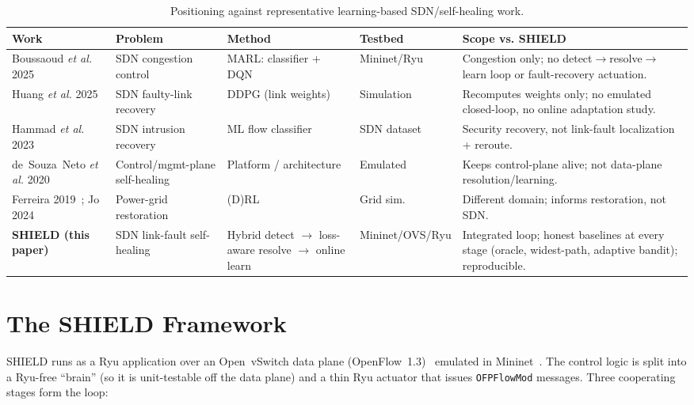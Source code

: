 \documentclass[conference]{IEEEtran}
\begin{document}
\begin{table}[t]
\centering
\footnotesize
\caption{Positioning against representative learning-based SDN/self-healing work.}
\label{tab:related}
\begin{tabular}{@{}p{2.0cm}p{2.7cm}p{2.6cm}p{2.2cm}p{4.4cm}@{}}
\toprule
\textbf{Work} & \textbf{Problem} & \textbf{Method} & \textbf{Testbed} & \textbf{Scope vs. SHIELD} \\
\midrule
Boussaoud \emph{et al.} 2025~\cite{boussaoud2025} & SDN congestion control & MARL: classifier + DQN & Mininet/Ryu & Congestion only; no detect$\rightarrow$resolve$\rightarrow$learn loop or fault-recovery actuation. \\
Huang \emph{et al.} 2025~\cite{huang2025} & SDN faulty-link recovery & DDPG (link weights) & Simulation & Recomputes weights only; no emulated closed-loop, no online adaptation study. \\
Hammad \emph{et al.} 2023~\cite{hammad2023} & SDN intrusion recovery & ML flow classifier & SDN dataset & Security recovery, not link-fault localization + reroute. \\
de~Souza~Neto \emph{et al.} 2020~\cite{neto2020} & Control/mgmt-plane self-healing & Platform / architecture & Emulated & Keeps control-plane alive; not data-plane resolution/learning. \\
Ferreira 2019~\cite{ferreira2019}; Jo 2024~\cite{jo2024} & Power-grid restoration & (D)RL & Grid sim. & Different domain; informs restoration, not SDN. \\
\textbf{SHIELD (this paper)} & SDN link-fault self-healing & Hybrid detect $\rightarrow$ loss-aware resolve $\rightarrow$ online learn & Mininet/OVS/Ryu & Integrated loop; honest baselines at every stage (oracle, widest-path, adaptive bandit); reproducible. \\
\bottomrule
\end{tabular}
\end{table}

\section{The SHIELD Framework}
\label{sec:arch}
SHIELD runs as a Ryu application over an Open~vSwitch data plane
(OpenFlow~1.3)~\cite{onf2012openflow,ryu} emulated in
Mininet~\cite{lantz2010mininet}. The control logic is split into a Ryu-free
``brain'' (so it is unit-testable off the data plane) and a thin Ryu actuator that
issues \texttt{OFPFlowMod} messages. Three cooperating stages form the loop:
\end{document}
